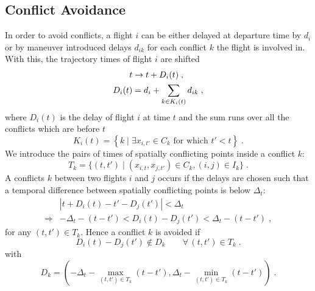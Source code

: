 \documentclass[aps,pra,twocolumn,10pt]{revtex4-1}
\begin{document}
\subsection{Conflict Avoidance}
In order to avoid conflicts, a flight $i$ can be either delayed at departure time by $d_i$ or by maneuver introduced delays $d_{ik}$ for each conflict $k$ the flight is involved in.
With this, the trajectory times of flight $i$ are shifted
\begin{align}
    t & \to t  + D_i(t) \; , \notag \\
    D_i(t) & = d_i + \sum_{k\in K_{i}(t)} d_{ik} \label{eqn:time_dependent_delay} \; , 
\end{align}
where $D_i(t)$ is the delay of flight $i$ at time $t$ and the sum runs over all the conflicts which are before $t$
\begin{equation*}
    K_{i}(t) = \left\{k \; |  \; \exists x_{i, t'} \in C_k \text{ for which } t' < t  \right\}  \; .
\end{equation*}
We introduce the pairs of times of spatially conflicting points inside a conflict $k$:
\begin{equation*}
    T_k =  \{(t, t') \; | \; (x_{i, t}, x_{j, t'}) \in C_k , (i, j) \in I_k \} \; .
\end{equation*}
A conflicts $k$ between two flights $i$ and $j$ occurs if the delays are chosen such that a temporal difference between spatially conflicting points is below $\Delta_t$:
\begin{align*}
    & |t + D_i(t) - t' - D_j(t')| < \Delta_t \\
    \Rightarrow  & - \Delta_t - (t - t') < D_i(t) - D_j(t') < \Delta_t - (t - t') \; , 
\end{align*}
for any $(t, t') \in T_k$.
Hence a conflict $k$ is avoided if
\begin{equation*}
    D_i(t) - D_j(t') \notin D_k \qquad \forall \, (t, t') \in T_k \; .
\end{equation*}
with
\begin{equation*}
    D_k = \left(-\Delta_t - \max_{(t, t') \in T_k} (t - t'), \Delta_t - \min_{(t, t') \in T_k} (t - t')\right) \; .
\end{equation*}

\end{document}
